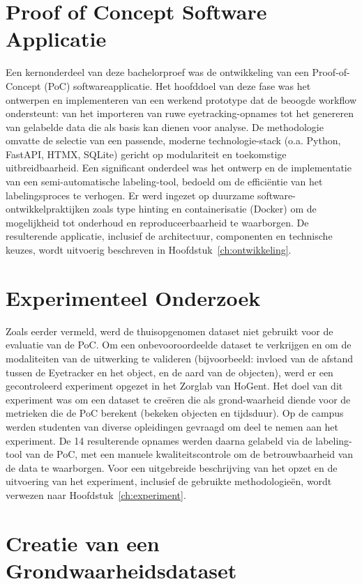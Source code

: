 \section{Proof of Concept Software Applicatie}

Een kernonderdeel van deze bachelorproef was de ontwikkeling van een Proof-of-Concept (PoC) softwareapplicatie. 
Het hoofddoel van deze fase was het ontwerpen en implementeren van een werkend prototype dat de beoogde workflow ondersteunt: van het importeren van ruwe eyetracking-opnames tot het genereren van gelabelde data die als basis kan dienen voor analyse. 
De methodologie omvatte de selectie van een passende, moderne technologie-stack (o.a. Python, FastAPI, HTMX, SQLite) gericht op modulariteit en toekomstige uitbreidbaarheid. 
Een significant onderdeel was het ontwerp en de implementatie van een semi-automatische labeling-tool, bedoeld om de efficiëntie van het labelingsproces te verhogen. 
Er werd ingezet op duurzame software-ontwikkelpraktijken zoals type hinting en containerisatie (Docker) om de mogelijkheid tot onderhoud en reproduceerbaarheid te waarborgen. 
De resulterende applicatie, inclusief de architectuur, componenten en technische keuzes, wordt uitvoerig beschreven in Hoofdstuk~\ref{ch:ontwikkeling}.

\section{Experimenteel Onderzoek}

Zoals eerder vermeld, werd de thuisopgenomen dataset niet gebruikt voor de evaluatie van de PoC. 
Om een onbevooroordeelde dataset te verkrijgen en om de modaliteiten van de uitwerking te valideren (bijvoorbeeld: invloed van de afstand tussen de Eyetracker en het object, en de aard van de objecten), werd er een gecontroleerd experiment opgezet in het Zorglab van HoGent.
Het doel van dit experiment was om een dataset te creëren die als grond-waarheid diende voor de metrieken die de PoC berekent (bekeken objecten en tijdsduur).
Op de campus werden studenten van diverse opleidingen gevraagd om deel te nemen aan het experiment.
De 14 resulterende opnames werden daarna gelabeld via de labeling-tool van de PoC, met een manuele kwaliteitscontrole om de betrouwbaarheid van de data te waarborgen.
Voor een uitgebreide beschrijving van het opzet en de uitvoering van het experiment, inclusief de gebruikte methodologieën, wordt verwezen naar Hoofdstuk~\ref{ch:experiment}.

\section{Creatie van een Grondwaarheidsdataset}

